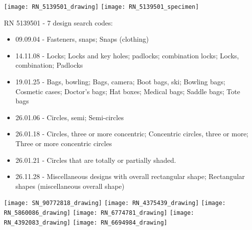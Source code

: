 \documentclass[aspectratio = 1610]{beamer}
\begin{document}
\begin{frame}

\begin{minipage}{.5\textwidth}
\texttt{[image: RN\_5139501\_drawing]}
\texttt{[image: RN\_5139501\_specimen]}
\end{minipage}%
\begin{minipage}{.5\textwidth}
\tiny

RN 5139501 - 7 design search codes:\par\bigskip

\begin{itemize}

\item 09.09.04 - Fasteners, snaps; Snaps (clothing)
\item 14.11.08 - Locks; Locks and key holes; padlocks; combination locks; Locks, combination; Padlocks
\item 19.01.25 - Bags, bowling; Bags, camera; Boot bags, ski; Bowling bags; Cosmetic cases; Doctor's bags; Hat boxes; Medical bags; Saddle bags; Tote bags
\item 26.01.06 - Circles, semi; Semi-circles
\item 26.01.18 - Circles, three or more concentric; Concentric circles, three or more; Three or more concentric circles
\item 26.01.21 - Circles that are totally or partially shaded.
\item 26.11.28 - Miscellaneous designs with overall rectangular shape; Rectangular shapes (miscellaneous overall shape)

\medskip

\end{itemize}
\end{minipage}

\end{frame}

\begin{frame}

\centering

\texttt{[image: SN\_90772818\_drawing]}
\texttt{[image: RN\_4375439\_drawing]}
\texttt{[image: RN\_5860086\_drawing]}
\texttt{[image: RN\_6774781\_drawing]}
\texttt{[image: RN\_4392083\_drawing]}
\texttt{[image: RN\_6694984\_drawing]}

\end{frame}
\end{document}
